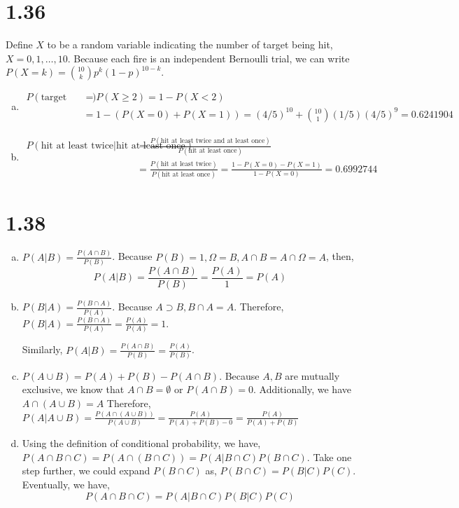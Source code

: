 \documentclass[letter]{article}
\begin{document}
    \section*{1.36}
    Define $X$ to be a random variable indicating the number of target being hit, $X = 0, 1, \dots, 10$. Because each fire is an independent Bernoulli trial, we can write $P(X = k) = \binom{10}{k} p^k (1-p)^{10-k}$.
    \begin{enumerate}[(a)]
    \item
    \begin{align*}
    P(\text{target being hit at least twice}) & = P(X \geq 2) = 1 - P(X < 2) \\
    & = 1- \left(P(X = 0) + P(X = 1)\right) = (4/5)^{10} + \binom{10}{1} (1/5) (4/5)^9 = 0.6241904 
    \end{align*}
    \item
    \begin{align*}
    P(\text{hit at least twice}|\text{hit at least once}) & = \frac{P(\text{hit at least twice and at least once})}{P(\text{hit at least once})} \\
    & = \frac{P(\text{hit at least twice})}{P(\text{hit at least once})} = \frac{1-P(X=0)-P(X=1)}{1-P(X=0)} = 0.6992744
    \end{align*}
    \end{enumerate}
    
    \section*{1.38}
    \begin{enumerate}[(a)]
    \item $P(A|B) = \frac{P(A \cap B)}{P(B)}$. Because $P(B) = 1, \Omega = B, A \cap B = A \cap \Omega = A$, then,
    \[
        P(A|B) = \frac{P(A \cap B)}{P(B)} = \frac{P(A)}{1} = P(A)
    \]
    \item $P(B|A) = \frac{P(B \cap A)}{P(A)}$. Because $A \supset B, B \cap A = A$. Therefore, $P(B|A) = \frac{P(B \cap A)}{P(A)} = \frac{P(A)}{P(A)} = 1$.

    Similarly, $P(A|B) = \frac{P(A \cap B)}{P(B)} = \frac{P(A)}{P(B)}$.

    \item $P(A \cup B) = P(A) + P(B) - P(A \cap B)$. Because $A, B$ are mutually exclusive, we know that $A \cap B = \emptyset$ or $P(A \cap B) = 0$.
    Additionally, we have $A \cap (A \cup B) = A$
    Therefore, $P(A|A \cup B) = \frac{P(A \cap \left(A \cup B \right))}{P(A \cup B)} = \frac{P(A)}{P(A)+P(B)-0} = \frac{P(A)}{P(A)+P(B)}$

    \item Using the definition of conditional probability, we have, 
    $P(A \cap B \cap C) = P\left(A \cap (B \cap C)\right) = P(A|B \cap C)P(B\cap C)$. Take one step further, we could expand $P(B \cap C)$ as, $P(B \cap C) = P(B|C)P(C)$. Eventually, we have,
    \[
    P(A \cap B \cap C) = P(A|B \cap C)P(B|C)P(C)
    \]

    \end{enumerate}
\end{document}
